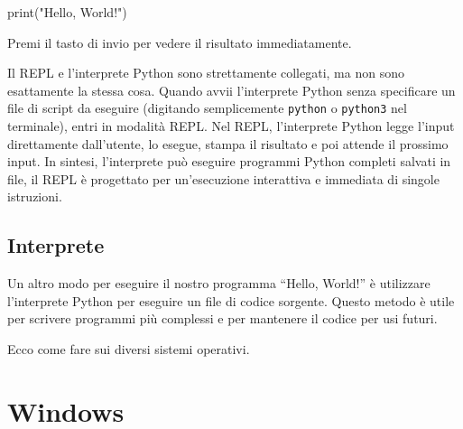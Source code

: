 \documentclass[
  letterpaper,
]{scrbook}
\newenvironment{Shaded}{\begin{snugshade}}{\end{snugshade}}
\newcommand{\BuiltInTok}[1]{\textcolor[rgb]{0.00,0.23,0.31}{#1}}
\newcommand{\NormalTok}[1]{\textcolor[rgb]{0.00,0.23,0.31}{#1}}
\newcommand{\StringTok}[1]{\textcolor[rgb]{0.13,0.47,0.30}{#1}}
\begin{document}
\begin{Shaded}
\begin{Highlighting}[]
\BuiltInTok{print}\NormalTok{(}\StringTok{"Hello, World!"}\NormalTok{)}
\end{Highlighting}
\end{Shaded}

Premi il tasto di invio per vedere il risultato immediatamente.

\begin{tcolorbox}[enhanced jigsaw, leftrule=.75mm, arc=.35mm, opacityback=0, rightrule=.15mm, titlerule=0mm, colbacktitle=quarto-callout-warning-color!10!white, colback=white, colframe=quarto-callout-warning-color-frame, bottomrule=.15mm, toprule=.15mm, bottomtitle=1mm, toptitle=1mm, title=\textcolor{quarto-callout-warning-color}{\faExclamationTriangle}\hspace{0.5em}{Attenzione}, breakable, coltitle=black, opacitybacktitle=0.6, left=2mm]

Il REPL e l'interprete Python sono strettamente collegati, ma non sono
esattamente la stessa cosa. Quando avvii l'interprete Python senza
specificare un file di script da eseguire (digitando semplicemente
\texttt{python} o \texttt{python3} nel terminale), entri in modalità
REPL. Nel REPL, l'interprete Python legge l'input direttamente
dall'utente, lo esegue, stampa il risultato e poi attende il prossimo
input. In sintesi, l'interprete può eseguire programmi Python completi
salvati in file, il REPL è progettato per un'esecuzione interattiva e
immediata di singole istruzioni.

\end{tcolorbox}

\subsection{Interprete}\label{interprete}

Un altro modo per eseguire il nostro programma ``Hello, World!'' è
utilizzare l'interprete Python per eseguire un file di codice sorgente.
Questo metodo è utile per scrivere programmi più complessi e per
mantenere il codice per usi futuri.

Ecco come fare sui diversi sistemi operativi.

\section{Windows}
\end{document}
